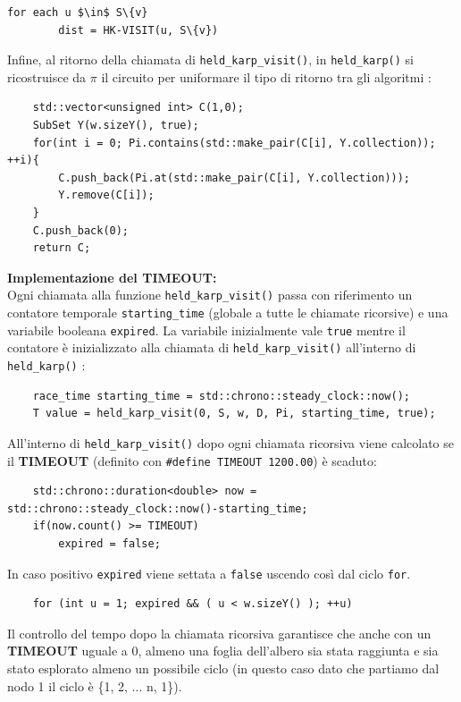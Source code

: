 \documentclass[]{article}
\begin{document}
\begin{flushleft}
\begin{lstlisting}[mathescape=true]
	for each u $\in$ S\{v}
		dist = HK-VISIT(u, S\{v})
\end{lstlisting}
Infine, al ritorno della chiamata di \verb|held_karp_visit()|, in \verb|held_karp()| si ricostruisce da $\pi$ il circuito per uniformare il tipo di ritorno tra gli algoritmi :
\lstset{language=c++, style=mystyle, firstnumber=43}
\begin{lstlisting}
    std::vector<unsigned int> C(1,0);
    SubSet Y(w.sizeY(), true);
    for(int i = 0; Pi.contains(std::make_pair(C[i], Y.collection)); ++i){
        C.push_back(Pi.at(std::make_pair(C[i], Y.collection)));
        Y.remove(C[i]);
    }
    C.push_back(0);
    return C;
\end{lstlisting}



\bigskip
\textbf{Implementazione del TIMEOUT:}\\
Ogni chiamata alla funzione \verb|held_karp_visit()| passa con riferimento un contatore temporale \verb|starting_time| (globale a tutte le chiamate ricorsive) e una variabile booleana \verb|expired|.
La variabile inizialmente vale \verb|true| mentre il contatore è inizializzato alla chiamata di \verb|held_karp_visit()| all'interno di \verb|held_karp()| :
\lstset{language=c++, style=mystyle, firstnumber=40}
\begin{lstlisting}
	race_time starting_time = std::chrono::steady_clock::now();
	T value = held_karp_visit(0, S, w, D, Pi, starting_time, true);
\end{lstlisting}
\smallskip
All'interno di \verb|held_karp_visit()| dopo ogni chiamata ricorsiva viene calcolato se il \textbf{TIMEOUT} (definito con \verb|#define TIMEOUT 1200.00|) è scaduto:
\lstset{language=c++, style=mystyle, firstnumber=21}
\begin{lstlisting}
	std::chrono::duration<double> now = std::chrono::steady_clock::now()-starting_time;
	if(now.count() >= TIMEOUT)
    	expired = false;
\end{lstlisting}
In caso positivo \verb|expired| viene settata a \verb|false| uscendo così dal ciclo \verb|for|.
\lstset{language=c++, style=mystyle, firstnumber=14}
\begin{lstlisting}
	for (int u = 1; expired && ( u < w.sizeY() ); ++u)
\end{lstlisting}
\medskip
Il controllo del tempo dopo la chiamata ricorsiva garantisce che anche con un \textbf{TIMEOUT} uguale a 0, almeno una foglia dell'albero sia stata raggiunta e sia stato esplorato almeno un possibile ciclo (in questo caso dato che partiamo dal nodo 1 il ciclo è \{1, 2, ... n, 1\}).
\end{flushleft}
\end{document}
